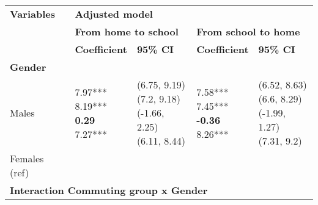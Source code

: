 \documentclass[10pt]{article}
\begin{document}
      \setlength{\fboxsep}{0pt}
      \begin{table}
      \begin{center}
      \begin{small}
      \begin{tabular}{lllll}
      \toprule
        \textbf{Variables}
          & \multicolumn{4}{l}{\textbf{Adjusted model}} \\ \cline{2-5}
        & \multicolumn{2}{l}{\textbf{From home to school}} 
          & \multicolumn{2}{l}{\textbf{From school to home}} \\ \cline{2-3} \cline{4-5}
        & \textbf{Coefficient} & \textbf{95\% CI} & \textbf{Coefficient} & \textbf{95\% CI} \\
      \midrule
    \textbf{Gender} & & & & \\ 
\quad Males    &  \makecell[l]{\textnormal{7.97***} \\\textnormal{8.19***} \\\textbf{0.29\phantom{***}} \\\textnormal{7.27***} \\}   &  \makecell[l]{\textnormal{(6.75, 9.19)} \\\textnormal{(7.2, 9.18)} \\\textnormal{(-1.66, 2.25)} \\\textnormal{(6.11, 8.44)} \\}   &  \makecell[l]{\textnormal{7.58***} \\\textnormal{7.45***} \\\textbf{-0.36\phantom{***}} \\\textnormal{8.26***} \\}   &  \makecell[l]{\textnormal{(6.52, 8.63)} \\\textnormal{(6.6, 8.29)} \\\textnormal{(-1.99, 1.27)} \\\textnormal{(7.31, 9.2)} \\} \\ 
\quad Females (ref) & & & & \\ 
\multicolumn{5}{l}{\textbf{Interaction Commuting group x Gender}} \\ 

\end{tabular}
\end{small}
\end{center}
\end{table}
\end{document}
